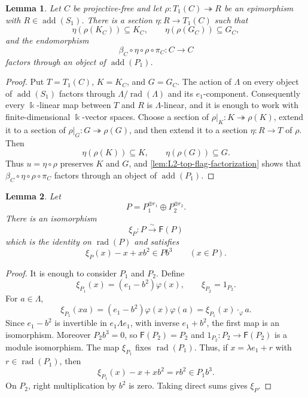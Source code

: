 \documentclass[a4paper,11pt,reqno]{amsart}
\newtheorem{lemma}[lemma]{Lemma}
\theoremstyle{definition}
\theoremstyle{plain}
\numberwithin{equation}{section}
\newcommand{\kk}{\Bbbk}
\begin{document}
\begin{lemma}
\label{lem:L2-adapted-top-splitting}
Let \(C\) be projective-free and let
\(\rho:T_1(C)\twoheadrightarrow R\) be an epimorphism with
\(R\in\operatorname{add}(S_1)\).  There is a section
\(\eta:R\to T_1(C)\) such that
\begin{equation}
\label{eq:L2-adapted-top-section}
 \eta(\rho(K_C))\subseteq K_C,
 \qquad
 \eta(\rho(G_C))\subseteq G_C,
\end{equation}
and the endomorphism
\begin{equation}
\label{eq:L2-top-defect}
 \beta_C\circ\eta\circ\rho\circ\pi_C:C\longrightarrow C
\end{equation}
factors through an object of \(\operatorname{add}(P_1)\).
\end{lemma}

\begin{proof}
Put \(T=T_1(C)\), \(K=K_C\), and \(G=G_C\).  The action of \(\Lambda\)
on every object of \(\operatorname{add}(S_1)\) factors through
\(\Lambda/\operatorname{rad}(\Lambda)\) and its \(e_1\)-component.
Consequently every \(\kk\)-linear map between \(T\) and \(R\) is
\(\Lambda\)-linear, and it is enough to work with finite-dimensional
\(\kk\)-vector spaces.  Choose a section of
\(\rho|_K:K\twoheadrightarrow\rho(K)\), extend it to a section of
\(\rho|_G:G\twoheadrightarrow\rho(G)\), and then extend it to a
section \(\eta:R\to T\) of \(\rho\).  Then
\[
 \eta(\rho(K))\subseteq K,
 \qquad
 \eta(\rho(G))\subseteq G.
\]
Thus \(u=\eta\circ\rho\) preserves \(K\) and \(G\), and
\cref{lem:L2-top-flag-factorization} shows that
\(\beta_C\circ\eta\circ\rho\circ\pi_C\) factors through an object of
\(\operatorname{add}(P_1)\).
\end{proof}

\begin{lemma}
\label{lem:L2-projective-comparison}
Let
\[
 P=P_1^{\oplus r_1}\oplus P_2^{\oplus r_2}.
\]
There is an isomorphism
\[
 \xi_P:P\xrightarrow{\sim}\mathsf F(P)
\]
which is the identity on \(\operatorname{rad}(P)\) and satisfies
\begin{equation}
\label{eq:L2-projective-difference}
 \xi_P(x)-x+xb^2\in Pb^3
 \qquad(x\in P).
\end{equation}
\end{lemma}

\begin{proof}
It is enough to consider \(P_1\) and \(P_2\).  Define
\[
 \xi_{P_1}(x)=(e_1-b^2)\varphi(x),
 \qquad
 \xi_{P_2}=1_{P_2}.
\]
For \(a\in\Lambda\),
\[
 \xi_{P_1}(xa)
 =(e_1-b^2)\varphi(x)\varphi(a)
 =\xi_{P_1}(x)\mathbin{\cdot_\varphi}a.
\]
Since \(e_1-b^2\) is invertible in \(e_1\Lambda e_1\), with inverse
\(e_1+b^2\), the first map is an isomorphism.  Moreover \(P_2b^3=0\), so
\(\mathsf F(P_2)=P_2\) and \(1_{P_2}:P_2\to\mathsf F(P_2)\) is a module
isomorphism.  The map \(\xi_{P_1}\) fixes
\(\operatorname{rad}(P_1)\).  Thus, if \(x=\lambda e_1+r\) with
\(r\in\operatorname{rad}(P_1)\), then
\[
 \xi_{P_1}(x)-x+xb^2=rb^2\in P_1b^3.
\]
On \(P_2\), right multiplication by \(b^2\) is zero.  Taking direct
sums gives \(\xi_P\).
\end{proof}
\end{document}
